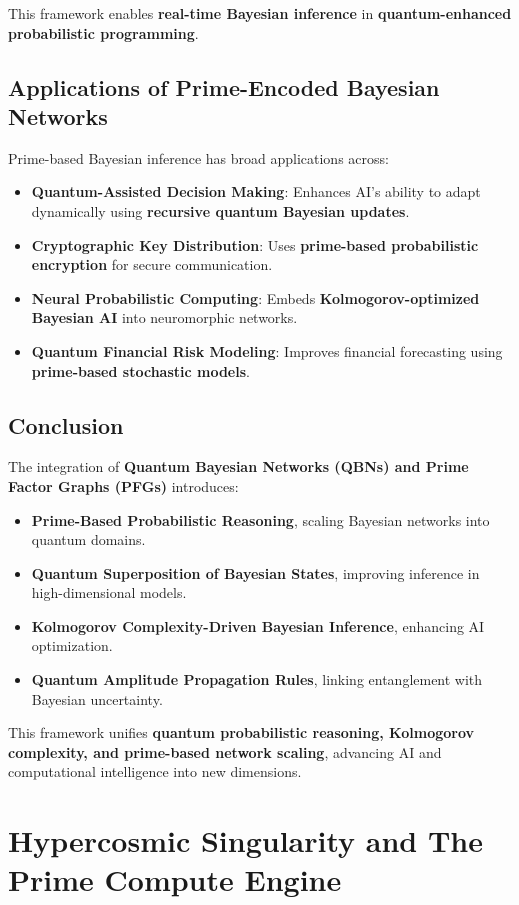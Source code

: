 \documentclass{article}
\theoremstyle{plain}
\theoremstyle{plain}
\theoremstyle{definition}
\theoremstyle{remark}
\begin{document}
This framework enables \textbf{real-time Bayesian inference} in \textbf{quantum-enhanced probabilistic programming}.

\subsection{Applications of Prime-Encoded Bayesian Networks}

Prime-based Bayesian inference has broad applications across:
\begin{itemize}
    \item \textbf{Quantum-Assisted Decision Making}: Enhances AI's ability to adapt dynamically using \textbf{recursive quantum Bayesian updates}.
    \item \textbf{Cryptographic Key Distribution}: Uses \textbf{prime-based probabilistic encryption} for secure communication.
    \item \textbf{Neural Probabilistic Computing}: Embeds \textbf{Kolmogorov-optimized Bayesian AI} into neuromorphic networks.
    \item \textbf{Quantum Financial Risk Modeling}: Improves financial forecasting using \textbf{prime-based stochastic models}.
\end{itemize}

\subsection{Conclusion}

The integration of \textbf{Quantum Bayesian Networks (QBNs) and Prime Factor Graphs (PFGs)} introduces:
\begin{itemize}
    \item \textbf{Prime-Based Probabilistic Reasoning}, scaling Bayesian networks into quantum domains.
    \item \textbf{Quantum Superposition of Bayesian States}, improving inference in high-dimensional models.
    \item \textbf{Kolmogorov Complexity-Driven Bayesian Inference}, enhancing AI optimization.
    \item \textbf{Quantum Amplitude Propagation Rules}, linking entanglement with Bayesian uncertainty.
\end{itemize}

This framework unifies \textbf{quantum probabilistic reasoning, Kolmogorov complexity, and prime-based network scaling}, advancing AI and computational intelligence into new dimensions.
\section{Hypercosmic Singularity and The Prime Compute Engine}
\end{document}
